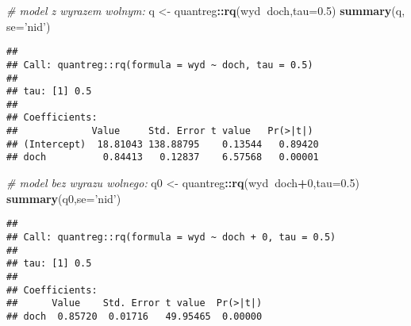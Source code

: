 \documentclass[polish,]{book}
\newenvironment{Shaded}{\begin{snugshade}}{\end{snugshade}}
\newcommand{\CommentTok}[1]{\textcolor[rgb]{0.56,0.35,0.01}{\textit{#1}}}
\newcommand{\DataTypeTok}[1]{\textcolor[rgb]{0.13,0.29,0.53}{#1}}
\newcommand{\DecValTok}[1]{\textcolor[rgb]{0.00,0.00,0.81}{#1}}
\newcommand{\FloatTok}[1]{\textcolor[rgb]{0.00,0.00,0.81}{#1}}
\newcommand{\KeywordTok}[1]{\textcolor[rgb]{0.13,0.29,0.53}{\textbf{#1}}}
\newcommand{\NormalTok}[1]{#1}
\newcommand{\OperatorTok}[1]{\textcolor[rgb]{0.81,0.36,0.00}{\textbf{#1}}}
\newcommand{\StringTok}[1]{\textcolor[rgb]{0.31,0.60,0.02}{#1}}
\begin{document}
\begin{Shaded}
\begin{Highlighting}[]
\CommentTok{# model z wyrazem wolnym:}
\NormalTok{q <-}\StringTok{ }\NormalTok{quantreg}\OperatorTok{::}\KeywordTok{rq}\NormalTok{(wyd}\OperatorTok{~}\NormalTok{doch,}\DataTypeTok{tau=}\FloatTok{0.5}\NormalTok{)}
\KeywordTok{summary}\NormalTok{(q, }\DataTypeTok{se=}\StringTok{'nid'}\NormalTok{)}
\end{Highlighting}
\end{Shaded}

\begin{verbatim}
## 
## Call: quantreg::rq(formula = wyd ~ doch, tau = 0.5)
## 
## tau: [1] 0.5
## 
## Coefficients:
##             Value     Std. Error t value   Pr(>|t|) 
## (Intercept)  18.81043 138.88795    0.13544   0.89420
## doch          0.84413   0.12837    6.57568   0.00001
\end{verbatim}

\begin{Shaded}
\begin{Highlighting}[]
\CommentTok{# model bez wyrazu wolnego:}
\NormalTok{q0 <-}\StringTok{ }\NormalTok{quantreg}\OperatorTok{::}\KeywordTok{rq}\NormalTok{(wyd}\OperatorTok{~}\NormalTok{doch}\OperatorTok{+}\DecValTok{0}\NormalTok{,}\DataTypeTok{tau=}\FloatTok{0.5}\NormalTok{)}
\KeywordTok{summary}\NormalTok{(q0,}\DataTypeTok{se=}\StringTok{'nid'}\NormalTok{)}
\end{Highlighting}
\end{Shaded}

\begin{verbatim}
## 
## Call: quantreg::rq(formula = wyd ~ doch + 0, tau = 0.5)
## 
## tau: [1] 0.5
## 
## Coefficients:
##      Value    Std. Error t value  Pr(>|t|)
## doch  0.85720  0.01716   49.95465  0.00000
\end{verbatim}
\end{document}
